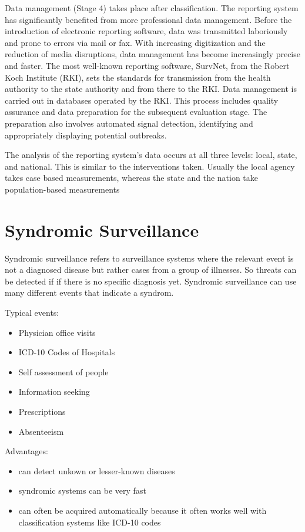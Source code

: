 \documentclass[
  letterpaper,
  DIV=11,
  numbers=noendperiod]{scrreprt}
\providecommand{\tightlist}{%
  \setlength{\itemsep}{0pt}\setlength{\parskip}{0pt}}\usepackage{longtable,booktabs,array}
\begin{document}
Data management (Stage 4) takes place after classification. The
reporting system has significantly benefited from more professional data
management. Before the introduction of electronic reporting software,
data was transmitted laboriously and prone to errors via mail or fax.
With increasing digitization and the reduction of media disruptions,
data management has become increasingly precise and faster. The most
well-known reporting software, SurvNet, from the Robert Koch Institute
(RKI), sets the standards for transmission from the health authority to
the state authority and from there to the RKI. Data management is
carried out in databases operated by the RKI. This process includes
quality assurance and data preparation for the subsequent evaluation
stage. The preparation also involves automated signal detection,
identifying and appropriately displaying potential outbreaks.

The analysis of the reporting system's data occurs at all three levels:
local, state, and national. This is similar to the interventions taken.
Usually the local agency takes case based measurements, whereas the
state and the nation take population-based measurements

\chapter{Syndromic Surveillance}\label{syndromic-surveillance}

Syndromic surveillance refers to surveillance systems where the relevant
event is not a diagnosed disease but rather cases from a group of
illnesses. So threats can be detected if if there is no specific
diagnosis yet. Syndromic surveillance can use many different events that
indicate a syndrom.

Typical events:

\begin{itemize}
\tightlist
\item
  Physician office visits
\item
  ICD-10 Codes of Hospitals
\item
  Self assessment of people
\item
  Information seeking
\item
  Prescriptions
\item
  Absenteeism
\end{itemize}

Advantages:

\begin{itemize}
\tightlist
\item
  can detect unkown or lesser-known diseases
\item
  syndromic systems can be very fast
\item
  can often be acquired automatically because it often works well with
  classification systems like ICD-10 codes
\end{itemize}
\end{document}
